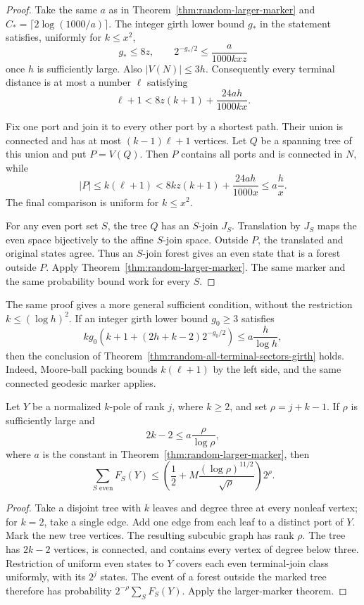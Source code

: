 \begin{proof}
Take the same $a$ as in Theorem~\ref{thm:random-larger-marker} and
$C_*=\lceil2\log(1000/a)\rceil$.
The integer girth lower bound $g_*$ in the statement satisfies, uniformly for $k\le x^2$,
\[
 g_*\le8z,\qquad 2^{-g_*/2}\le\frac{a}{1000kxz}
\]
once $h$ is sufficiently large.
Also $|V(N)|\le3h$.
Consequently every terminal distance is at most a number $\ell$ satisfying
\[
 \ell+1<8z(k+1)+\frac{24ah}{1000kx}.
\]

Fix one port and join it to every other port by a shortest path.
Their union is connected and has at most $(k-1)\ell+1$ vertices.
Let $Q$ be a spanning tree of this union and put $P=V(Q)$.
Then $P$ contains all ports and is connected in $N$, while
\[
 |P|\le k(\ell+1)
 <8kz(k+1)+\frac{24ah}{1000x}
 \le a\frac h x.
\]
The final comparison is uniform for $k\le x^2$.

For any even port set $S$, the tree $Q$ has an $S$-join $J_S$.
Translation by $J_S$ maps the even space bijectively to the affine $S$-join space.
Outside $P$, the translated and original states agree.
Thus an $S$-join forest gives an even state that is a forest outside $P$.
Apply Theorem~\ref{thm:random-larger-marker}.
The same marker and the same probability bound work for every $S$.
\end{proof}

The same proof gives a more general sufficient condition, without the restriction $k\le(\log h)^2$.
If an integer girth lower bound $g_0\ge3$ satisfies
\[
 k g_0\left(k+1+(2h+k-2)2^{-g_0/2}\right)
 \le a\frac{h}{\log h},
\]
then the conclusion of Theorem~\ref{thm:random-all-terminal-sectors-girth} holds.
Indeed, Moore-ball packing bounds $k(\ell+1)$ by the left side, and the same connected geodesic marker applies.

\begin{lemma}
\label{lem:random-growing-port-aggregate}
Let $Y$ be a normalized $k$-pole of rank $j$, where $k\ge2$, and set $\rho=j+k-1$.
If $\rho$ is sufficiently large and
\[
 2k-2\le a\frac{\rho}{\log\rho},
\]
where $a$ is the constant in Theorem~\ref{thm:random-larger-marker}, then
\[
 \sum_{S\text{ even}}F_S(Y)
 \le
 \left(\frac12+M\frac{(\log\rho)^{11/2}}{\sqrt\rho}\right)2^\rho.
\]
\end{lemma}

\begin{proof}
Take a disjoint tree with $k$ leaves and degree three at every nonleaf vertex; for $k=2$, take a single edge.
Add one edge from each leaf to a distinct port of $Y$.
Mark the new tree vertices.
The resulting subcubic graph has rank $\rho$.
The tree has $2k-2$ vertices, is connected, and contains every vertex of degree below three.
Restriction of uniform even states to $Y$ covers each even terminal-join class uniformly, with its $2^j$ states.
The event of a forest outside the marked tree therefore has probability
$2^{-\rho}\sum_S F_S(Y)$.
Apply the larger-marker theorem.
\end{proof}

